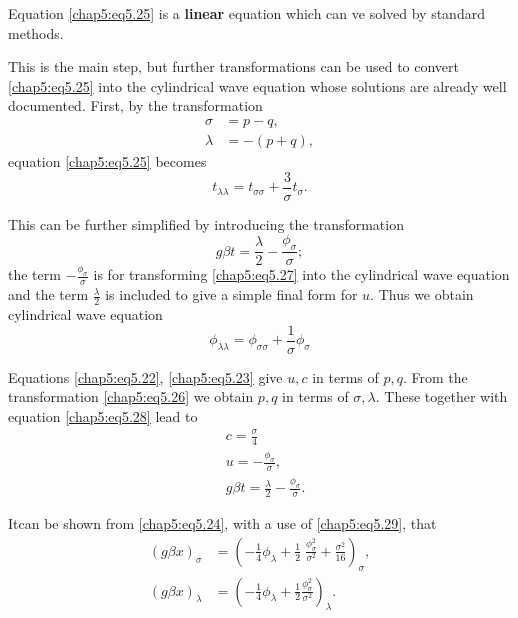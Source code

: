 Equation \eqref{chap5:eq5.25} is a {\bf linear} equation which can ve solved by standard methods.

This is the main step, but further transformations can be used to convert \eqref{chap5:eq5.25} into the cylindrical wave equation whose solutions are already well documented. First, by the transformation 
\begin{equation}
\begin{aligned}
\sigma &= p-q,\\
\lambda &= -(p+q),
\end{aligned}\tag{5.26}\label{chap5:eq5.26}
\end{equation}
equation \eqref{chap5:eq5.25} becomes
\begin{equation}
t_{\lambda\lambda}=t_{\sigma\sigma}+\frac{3}{\sigma}t_\sigma. \tag{5.27}\label{chap5:eq5.27}
\end{equation}

This can be further simplified by introducing the transformation
\begin{equation}
g\beta t=\frac{\lambda}{2}-\frac{\phi_\sigma}{\sigma}; \tag{5.28}\label{chap5:eq5.28}
\end{equation}
the term $-\frac{\phi_\sigma}{\sigma}$ is for transforming \eqref{chap5:eq5.27} into the cylindrical wave equation and the term $\frac{\lambda}{2}$ is included to give a simple final form for $u$. Thus we obtain cylindrical wave equation 
\begin{equation}
\phi_{\lambda\lambda}=\phi_{\sigma\sigma}+\frac{1}{\sigma}\phi_\sigma \tag{5.29}\label{chap5:eq5.29}
\end{equation}

Equations \eqref{chap5:eq5.22}, \eqref{chap5:eq5.23} give $u,c$ in terms of $p,q$. From the transformation \eqref{chap5:eq5.26} we obtain $p,q$ in terms of $\sigma,\lambda$. These together with equation \eqref{chap5:eq5.28} lead to
\begin{align}
& c=\frac{\sigma}{4}\tag{5.30}\label{chap5:eq5.30}\\
& u=-\frac{\phi_\sigma}{\sigma},\tag{5.31}\label{chap5:eq5.31}\\
& g\beta t=\frac{\lambda}{2}-\frac{\phi_\sigma}{\sigma}.\tag{5.32}\label{chap5:eq5.32}
\end{align}

It\pageoriginale can be shown from \eqref{chap5:eq5.24}, with a use of \eqref{chap5:eq5.29}, that 
\begin{align*}
(g\beta x)_\sigma &= \left(-\frac{1}{4}\phi_\lambda +\frac{1}{2}\;\frac{\phi^2_\sigma}{\sigma^2}+\frac{\sigma^2}{16}\right)_\sigma,\\
(g\beta x)_\lambda &= \left( -\frac{1}{4}\phi_\lambda +\frac{1}{2}\frac{\phi_\sigma^2}{\sigma^2}\right)_\lambda.
\end{align*}

